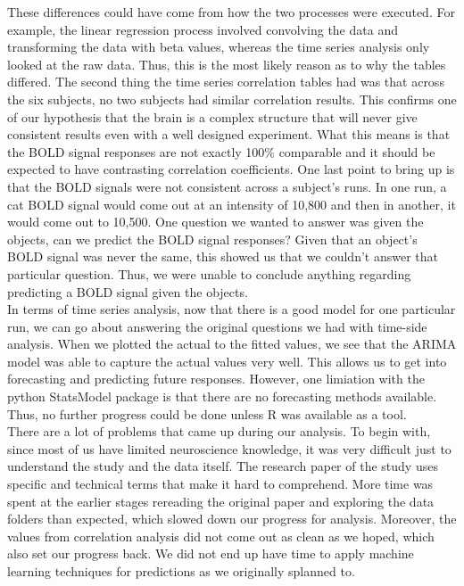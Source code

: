 \documentclass[11pt,twocolumn]{article}
\begin{document}
These differences could have come from how
the two processes were executed. For example, the linear regression process
involved convolving the data and transforming the data with beta values, 
whereas the time series analysis only looked at the raw data. Thus, this is
the most likely reason as to why the tables differed. The second thing the time
series correlation tables had was that across the six subjects, no two subjects
had similar correlation results. This confirms one of our hypothesis that 
the brain is a complex structure that will never give consistent results even
with a well designed experiment. What this means is that the BOLD signal
responses are not exactly 100\% comparable and it should be expected to have
contrasting correlation coefficients. One last point to bring up is that
the BOLD signals were not consistent across a subject's runs. In one run, a
cat BOLD signal would come out at an intensity of 10,800 and then in another,
it would come out to 10,500. One question we wanted to answer was given the
objects, can we predict the BOLD signal responses? Given that an object's
BOLD signal was never the same, this showed us that we couldn't answer that
particular question. Thus, we were unable to conclude anything regarding
predicting a BOLD signal given the objects. \\

In terms of time series analysis, now that there is a good model 
for one particular run, we can go about
answering the original questions we had with time-side analysis. When we 
plotted the actual to the fitted values, we see that the ARIMA model was 
able to capture the actual values very well. This allows us to get into
forecasting and predicting future responses. However, one limiation with
the python StatsModel package is that there are no forecasting methods
available. Thus, no further progress could be done unless R was available
as a tool. \\

There are a lot of problems that came up during our analysis. To begin with, 
since most of us have limited neuroscience knowledge, it was very difficult 
just to understand the study and the data itself. The research paper of the 
study uses specific and technical terms that make it hard to comprehend. 
More time was spent at the earlier stages rereading the 
original paper and exploring the data folders than expected, which slowed down 
our progress for analysis. Moreover, the values from correlation analysis 
did not come out as clean as we hoped, which also set our progress back. 
We did not end up have time to apply machine learning techniques for 
predictions as we originally splanned to. \\





\end{document}
